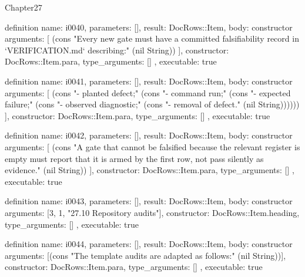 \begin{lexlean}{Chapter27}
\begin{semanticmodule}
definition{
  name: i0040,
  parameters: [],
  result: DocRows::Item,
  body: constructor{
    arguments: [
      (cons "Every new gate must have a committed falsifiability record in `VERIFICATION.md` describing:" (nil String))
    ],
    constructor: DocRows::Item.para,
    type_arguments: []
  },
  executable: true
}

definition{
  name: i0041,
  parameters: [],
  result: DocRows::Item,
  body: constructor{
    arguments: [
      (cons "- planted defect;" (cons "- command run;" (cons "- expected failure;" (cons "- observed diagnostic;" (cons "- removal of defect." (nil String))))))
    ],
    constructor: DocRows::Item.para,
    type_arguments: []
  },
  executable: true
}

definition{
  name: i0042,
  parameters: [],
  result: DocRows::Item,
  body: constructor{
    arguments: [
      (cons "A gate that cannot be falsified because the relevant register is empty must report that it is armed by the first row, not pass silently as evidence." (nil String))
    ],
    constructor: DocRows::Item.para,
    type_arguments: []
  },
  executable: true
}

definition{
  name: i0043,
  parameters: [],
  result: DocRows::Item,
  body: constructor{
    arguments: [3, 1, "27.10 Repository audits"],
    constructor: DocRows::Item.heading,
    type_arguments: []
  },
  executable: true
}

definition{
  name: i0044,
  parameters: [],
  result: DocRows::Item,
  body: constructor{
    arguments: [(cons "The template audits are adapted as follows:" (nil String))],
    constructor: DocRows::Item.para,
    type_arguments: []
  },
  executable: true
}


\end{semanticmodule}
\end{lexlean}
